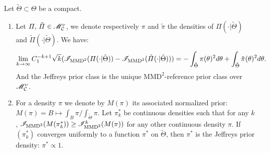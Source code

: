     \begin{prop}
        Let $\tilde\Theta\subset\Theta$ be a compact. 
        \begin{enumerate}
            \item Let $\varPi,\,\tilde\varPi\in\mathscr{M}^\nu_{\mathcal{C}}$, we denote respectively $\pi$ and $\tilde\pi$ the densities of $\varPi(\cdot|\tilde\Theta)$ and $\tilde\varPi(\cdot|\tilde\Theta)$. We have:
            \begin{equation}
                \lim_{k\rightarrow\infty} C_1^{-k+1}\sqrt{k}(\mathscr{I}_{\text{MMD}^2}(\varPi(\cdot|\tilde\Theta))-\mathscr{I}_{\text{MMD}^2}(\tilde\varPi(\cdot|\tilde\Theta)) ) = -\int_{\tilde\Theta}\pi(\theta)^2d\theta + \int_{\tilde\Theta}\tilde\pi(\theta)^2d\theta.
            \end{equation}
            And the Jeffreys prior class is the unique $\text{MMD}^2$-reference prior class over $\mathscr{M}^\nu_{\mathcal{C}}$.
            \item For a density $\pi$ %
            we denote by $M(\pi)$ its associated normalized prior: $M(\pi)=B\mapsto\int_B\pi/\int_{\tilde\Theta}\pi$.
            Let $\pi^\ast_k$ be continuous densities such that for any $k$, $\mathscr{I}_{\text{MMD}^2}(M(\pi^\ast_k))\geq \mathscr{I}^k_{\text{MMD}^2}(M(\pi))$ for any other continuous density $\pi$.
            If $(\pi^\ast_k)$ converges uniformly to a function $\pi^\ast$ on $\tilde\Theta$, then $\pi^\ast$ is the Jeffreys prior density: $\pi^\ast\propto1$.
        \end{enumerate}
    \end{prop}

